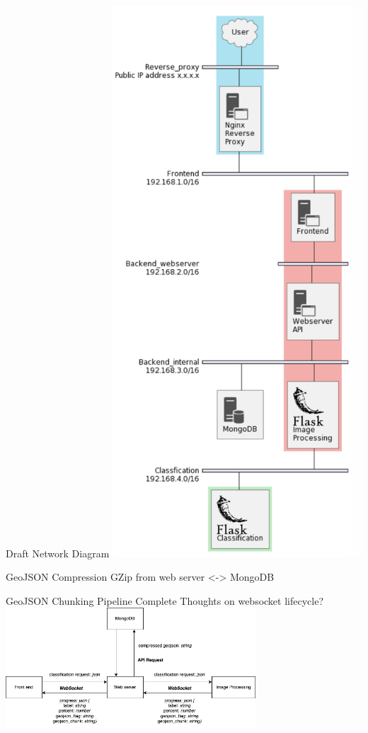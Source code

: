 \begin{frame}{Draft Network Diagram}
    \centering
    \includegraphics[height=0.7\textheight,width=0.7\textwidth,keepaspectratio]{images/network.png}
\end{frame}

\begin{frame}{GeoJSON Compression}
    GZip from web server <-> MongoDB
\end{frame}

\begin{frame}{GeoJSON Chunking Pipeline Complete}
    Thoughts on websocket lifecycle?
    \centering
    \includegraphics[height=0.7\textheight,width=0.7\textwidth,keepaspectratio]{images/websocket.png}
\end{frame}